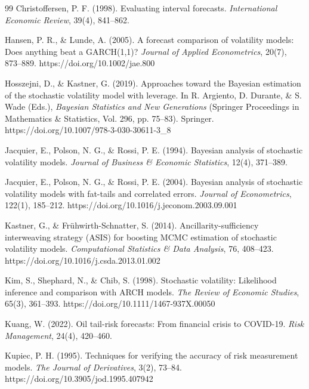 \documentclass[preprint,12pt,authoryear]{elsarticle}
\begin{document}
\begin{thebibliography}{99}
Christoffersen, P. F. (1998). Evaluating interval forecasts. \textit{International Economic Review}, 39(4), 841--862.

Hansen, P. R., \& Lunde, A. (2005). A forecast comparison of volatility models: Does anything beat a GARCH(1,1)? \textit{Journal of Applied Econometrics}, 20(7), 873--889. https://doi.org/10.1002/jae.800

Hosszejni, D., \& Kastner, G. (2019). Approaches toward the Bayesian estimation of the stochastic volatility model with leverage. In R. Argiento, D. Durante, \& S. Wade (Eds.), \textit{Bayesian Statistics and New Generations} (Springer Proceedings in Mathematics \& Statistics, Vol. 296, pp. 75--83). Springer. https://doi.org/10.1007/978-3-030-30611-3\_8

Jacquier, E., Polson, N. G., \& Rossi, P. E. (1994). Bayesian analysis of stochastic volatility models. \textit{Journal of Business \& Economic Statistics}, 12(4), 371--389.

Jacquier, E., Polson, N. G., \& Rossi, P. E. (2004). Bayesian analysis of stochastic volatility models with fat-tails and correlated errors. \textit{Journal of Econometrics}, 122(1), 185--212. https://doi.org/10.1016/j.jeconom.2003.09.001

Kastner, G., \& Fr\"uhwirth-Schnatter, S. (2014). Ancillarity-sufficiency interweaving strategy (ASIS) for boosting MCMC estimation of stochastic volatility models. \textit{Computational Statistics \& Data Analysis}, 76, 408--423. https://doi.org/10.1016/j.csda.2013.01.002

Kim, S., Shephard, N., \& Chib, S. (1998). Stochastic volatility: Likelihood inference and comparison with ARCH models. \textit{The Review of Economic Studies}, 65(3), 361--393. https://doi.org/10.1111/1467-937X.00050

Kuang, W. (2022). Oil tail-risk forecasts: From financial crisis to COVID-19. \textit{Risk Management}, 24(4), 420--460.

Kupiec, P. H. (1995). Techniques for verifying the accuracy of risk measurement models. \textit{The Journal of Derivatives}, 3(2), 73--84. https://doi.org/10.3905/jod.1995.407942


\end{thebibliography}
\end{document}
